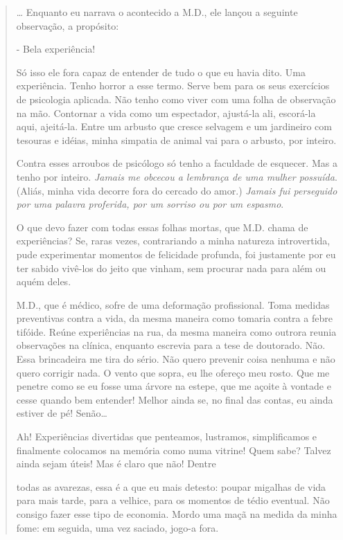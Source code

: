 \begin{quote}
\ldots{} Enquanto eu narrava o acontecido a M.D., ele lançou a seguinte
observação, a propósito:

- Bela experiência!

Só isso ele fora capaz de entender de tudo o que eu havia dito. Uma
experiência. Tenho horror a esse termo. Serve bem para os seus
exercícios de psicologia aplicada. Não tenho como viver com uma folha de
observação na mão. Contornar a vida como um espectador, ajustá-la ali,
escorá-la aqui, ajeitá-la. Entre um arbusto que cresce selvagem e um
jardineiro com tesouras e idéias, minha simpatia de animal vai para o
arbusto, por inteiro.

Contra esses arroubos de psicólogo só tenho a faculdade de esquecer. Mas
a tenho por inteiro. \emph{Jamais me obcecou a lembrança de uma mulher
possuída}. (Aliás, minha vida decorre fora do cercado do amor.)
\emph{Jamais fui perseguido por uma palavra proferida, por um sorriso ou
por um espasmo}.

O que devo fazer com todas essas folhas mortas, que M.D. chama de
experiências? Se, raras vezes, contrariando a minha natureza
introvertida, pude experimentar momentos de felicidade profunda, foi
justamente por eu ter sabido vivê-los do jeito que vinham, sem procurar
nada para além ou aquém deles.

M.D., que é médico, sofre de uma deformação profissional. Toma medidas
preventivas contra a vida, da mesma maneira como tomaria contra a febre
tifóide. Reúne experiências na rua, da mesma maneira como outrora reunia
observações na clínica, enquanto escrevia para a tese de doutorado. Não.
Essa brincadeira me tira do sério. Não quero prevenir coisa nenhuma e
não quero corrigir nada. O vento que sopra, eu lhe ofereço meu rosto.
Que me penetre como se eu fosse uma árvore na estepe, que me açoite à
vontade e cesse quando bem entender! Melhor ainda se, no final das
contas, eu ainda estiver de pé! Senão\ldots{}

Ah! Experiências divertidas que penteamos, lustramos, simplificamos e
finalmente colocamos na memória como numa vitrine! Quem sabe? Talvez
ainda sejam úteis! Mas é claro que não! Dentre

todas as avarezas, essa é a que eu mais detesto: poupar migalhas de vida
para mais tarde, para a velhice, para os momentos de tédio eventual. Não
consigo fazer esse tipo de economia. Mordo uma maçã na medida da minha
fome: em seguida, uma vez saciado, jogo-a fora.
\end{quote}

